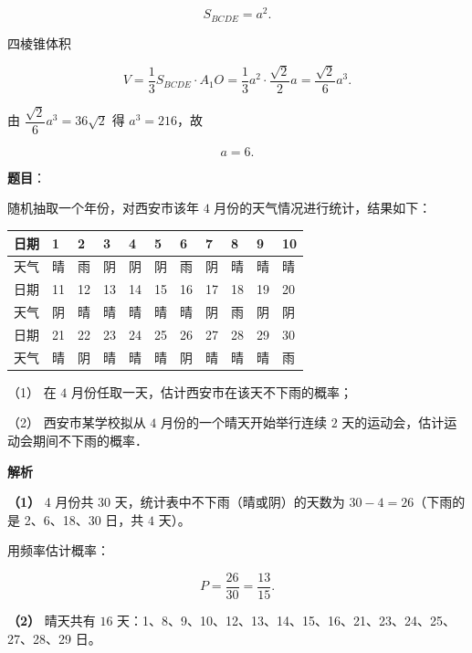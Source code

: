 \begin{answer}
\nopagebreak[4]
\[
S_{BCDE}=a^{2}.
\]

四棱锥体积

\nopagebreak[4]
\[
V=\frac{1}{3}S_{BCDE}\cdot A_{1}O=\frac{1}{3}a^{2}\cdot\frac{\sqrt{2}}{2}a=\frac{\sqrt{2}}{6}a^{3}.
\]

由 $\dfrac{\sqrt{2}}{6}a^{3}=36\sqrt{2}$ 得 $a^{3}=216$，故

\nopagebreak[4]
\[
a=6.
\]



\end{answer}
\begin{answer}

\textbf{题目}：

随机抽取一个年份，对西安市该年 $4$ 月份的天气情况进行统计，结果如下：

\begin{center}
\begingroup\setlength{\tabcolsep}{4pt}
\begin{tabular}{lllllllllll}
\toprule
日期 & 1 & 2 & 3 & 4 & 5 & 6 & 7 & 8 & 9 & 10 \\
\midrule
天气 & 晴 & 雨 & 阴 & 阴 & 阴 & 雨 & 阴 & 晴 & 晴 & 晴 \\
日期 & 11 & 12 & 13 & 14 & 15 & 16 & 17 & 18 & 19 & 20 \\
天气 & 阴 & 晴 & 晴 & 晴 & 晴 & 晴 & 阴 & 雨 & 阴 & 阴 \\
日期 & 21 & 22 & 23 & 24 & 25 & 26 & 27 & 28 & 29 & 30 \\
天气 & 晴 & 阴 & 晴 & 晴 & 晴 & 阴 & 晴 & 晴 & 晴 & 雨 \\
\bottomrule
\end{tabular}
\endgroup
\end{center}

（1） 在 $4$ 月份任取一天，估计西安市在该天不下雨的概率；

（2） 西安市某学校拟从 $4$ 月份的一个晴天开始举行连续 $2$ 天的运动会，估计运动会期间不下雨的概率．

\textbf{解析}

\textbf{（1）} 4 月份共 $30$ 天，统计表中不下雨（晴或阴）的天数为 $30-4=26$（下雨的是 2、6、18、30 日，共 $4$ 天）。

用频率估计概率：

\nopagebreak[4]
\[
P=\frac{26}{30}=\frac{13}{15}.
\]

\textbf{（2）} 晴天共有 $16$ 天：1、8、9、10、12、13、14、15、16、21、23、24、25、27、28、29 日。


\end{answer}
